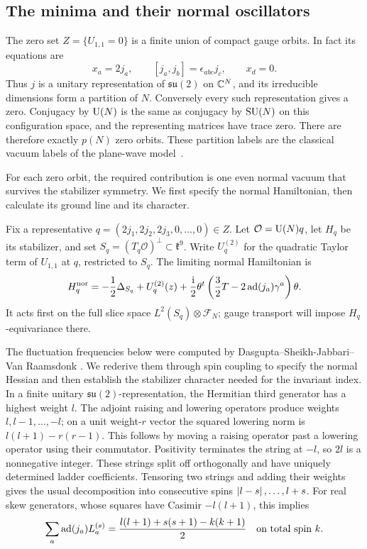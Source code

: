 \subsection{The minima and their normal oscillators}

The zero set \(Z=\{U_{1,1}=0\}\) is a finite union of compact gauge
orbits. In fact its equations are
\[
 x_a=2j_a,\qquad [j_a,j_b]=\epsilon_{abc}j_c,\qquad x_d=0.
\]
Thus \(j\) is a unitary representation of \(\mathfrak{su}(2)\) on
\(\mathbb C^N\), and its irreducible dimensions form a partition of \(N\).
Conversely every such representation gives a zero. Conjugacy by
\(\operatorname{U}(N)\) is the same as conjugacy by \(\operatorname{SU}(N)\) on this
configuration space, and the representing matrices have trace zero.
There are therefore exactly \(p(N)\) zero orbits.
These partition labels are the classical vacuum labels of the plane-wave
model~\cite[Sec.~5]{BMN2002}.

For each zero orbit, the required contribution is one even normal
vacuum that survives the stabilizer symmetry. We first specify the
normal Hamiltonian, then calculate its ground line and its character.

Fix a representative \(q=(2j_1,2j_2,2j_3,0,\ldots,0)\in Z\).
Let \(\mathcal O=\operatorname{U}(N)q\), let \(H_q\) be its stabilizer, and set
\(S_q=(T_q\mathcal O)^\perp\subset\mathfrak k^9\). Write
\(U_q^{(2)}\) for the quadratic Taylor term of \(U_{1,1}\) at
\(q\), restricted to \(S_q\). The limiting normal Hamiltonian is
\begin{equation}
\label{mass:normal-Hamiltonian}
 H_q^{\mathrm{nor}}
 =-\frac12\Delta_{S_q}+U_q^{(2)}(z)
   +\frac{\mathrm i}{2}\theta^t
      \left(\frac32T-2\operatorname{ad}(j_a)\gamma^a\right)\theta.
\end{equation}
It acts first on the full slice space
\(L^2(S_q)\otimes\mathcal F_N\); gauge transport will impose
\(H_q\)-equivariance there.

The fluctuation frequencies below were computed by
Dasgupta--Sheikh-Jabbari--Van Raamsdonk
\cite[Sections~5.2--5.4]{DasguptaSheikhJabbariVanRaamsdonk2002}.
We rederive them through spin coupling to specify the normal Hessian
and then establish the stabilizer character needed for the invariant
index. In a finite
unitary \(\mathfrak{su}(2)\)-representation, the Hermitian third
generator has a highest weight \(l\). The adjoint raising and
lowering operators produce weights \(l,l-1,\ldots,-l\); on a unit
weight-\(r\) vector the squared lowering norm is
\(l(l+1)-r(r-1)\). This follows by moving a raising operator past a
lowering operator using their commutator. Positivity terminates the
string at \(-l\), so \(2l\) is a nonnegative integer. These strings
split off orthogonally and have uniquely determined ladder
coefficients. Tensoring two strings and adding their weights gives
the usual decomposition into consecutive spins
\(\left\lvert l-s\right\rvert,\ldots,l+s\). For real skew generators, whose squares
have Casimir \(-l(l+1)\), this implies
\begin{equation}
\label{mass:spin-coupling}
 \sum_a\operatorname{ad}(j_a)L_a^{(s)}
 =\frac{l(l+1)+s(s+1)-k(k+1)}2
 \quad\text{on total spin }k.
\end{equation}

